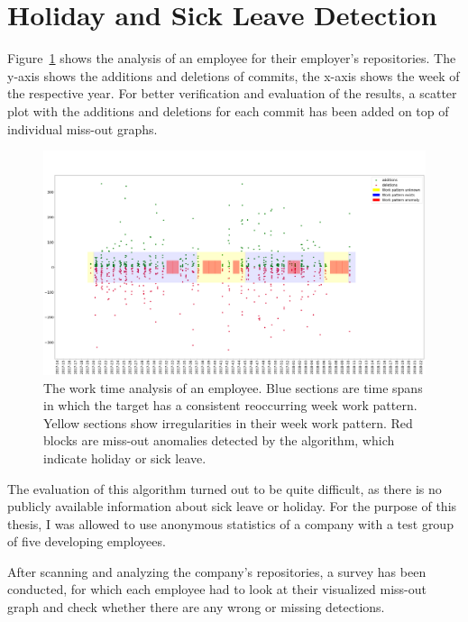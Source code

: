 \section{Holiday and Sick Leave Detection}

Figure~\ref{fig:missing-time} shows the analysis of an employee for their employer's repositories.
The y-axis shows the additions and deletions of commits, the x-axis shows the week of the respective year.
For better verification and evaluation of the results, a scatter plot with the additions and deletions for each commit has been added on top of individual miss-out graphs.

\begin{figure}[H]
    \includegraphics[scale=0.20]{./graphs/analysis/work-time-analysis}
    \centering
    \caption{
        The work time analysis of an employee.
        Blue sections are time spans in which the target has a consistent reoccurring week work pattern.
        Yellow sections show irregularities in their week work pattern.
        Red blocks are miss-out anomalies detected by the algorithm, which indicate holiday or sick leave.
    }\label{fig:missing-time}
\end{figure}

The evaluation of this algorithm turned out to be quite difficult, as there is no publicly available information about sick leave or holiday.
For the purpose of this thesis, I was allowed to use anonymous statistics of a company with a test group of five developing employees.

After scanning and analyzing the company's repositories, a survey has been conducted, for which each employee had to look at their visualized miss-out graph and check whether there are any wrong or missing detections.

